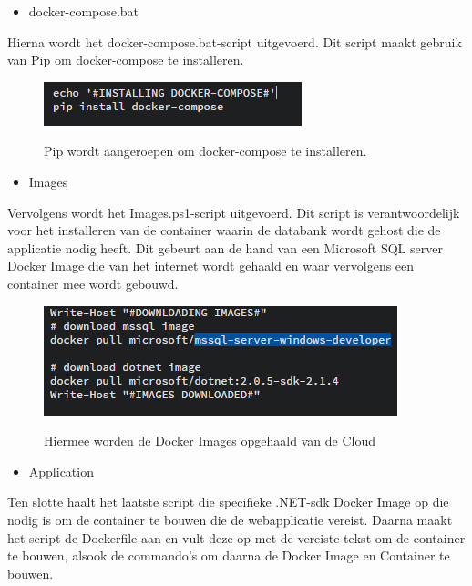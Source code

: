 \begin{itemize}[noitemsep]
	\item docker-compose.bat
\end{itemize}

Hierna wordt het docker-compose.bat-script uitgevoerd. Dit script maakt gebruik van Pip om docker-compose te installeren.

\begin{figure}
	\centering
	\caption{Pip wordt aangeroepen om docker-compose te installeren.}
	\includegraphics[scale=0.6]{img/dockercompose01}
	\label{dockercompose}
\end{figure}

\begin{itemize}[noitemsep]
	\item Images
\end{itemize}

Vervolgens wordt het Images.ps1-script uitgevoerd. Dit script is verantwoordelijk voor het installeren van de container waarin de databank wordt gehost die de applicatie nodig heeft. Dit gebeurt aan de hand van een Microsoft SQL server Docker Image die van het internet wordt gehaald en waar vervolgens een container mee wordt gebouwd.

\begin{figure}
	\centering
	\caption{Hiermee worden de Docker Images opgehaald van de Cloud}
	\includegraphics[scale=0.6]{img/dockerimages}
	\label{dockerimages}
\end{figure}

\begin{itemize}[noitemsep]
	\item Application
\end{itemize}

Ten slotte haalt het laatste script die specifieke .NET-sdk Docker Image op die nodig is om de container te bouwen die de webapplicatie vereist. Daarna maakt het script de Dockerfile aan en vult deze op met de vereiste tekst om de container te bouwen, alsook de commando's om daarna de Docker Image en Container te bouwen.


